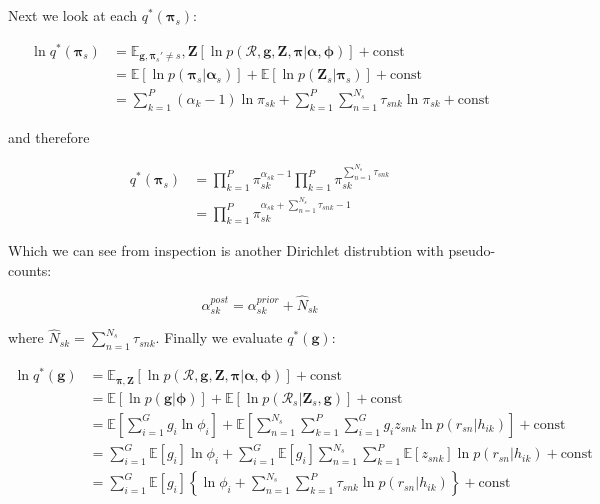 \documentclass{article}
\begin{document}
Next we look at each $q^*(\boldsymbol{\pi}_s)$:

\begin{align}
\label{eq:cnv_ln_q_pi}
\ln q^*(\boldsymbol{\pi}_s) &= \mathbb{E}_{\boldsymbol{g}, \boldsymbol{\pi}_s' \ne s}, \boldsymbol{Z} [\ln p(\mathcal{R}, \boldsymbol{g}, \boldsymbol{Z}, \boldsymbol{\pi} | \boldsymbol{\alpha}, \boldsymbol{\phi})] + \text{const} \\
&= \mathbb{E}[\ln p(\boldsymbol{\pi}_s | \boldsymbol{\alpha}_s)] + \mathbb{E}[\ln p(\boldsymbol{Z}_s | \boldsymbol{\pi}_s)] + \text{const} \\
&= \sum_{k = 1}^P (\alpha_k - 1) \ln \pi_{sk} + \sum_{k = 1}^P \sum_{n = 1}^{N_s} \tau_{snk} \ln \pi_{sk} + \text{const}
\end{align}

and therefore

\begin{align}
\label{eq:cnv_q_pi}
q^*(\boldsymbol{\pi}_s) &= \prod_{k = 1}^P \pi_{sk}^{\alpha_{sk} - 1} \prod_{k = 1}^P \pi_{sk}^{\sum_{n = 1}^{N_s} \tau_{snk}} \\
&=  \prod_{k = 1}^P \pi_{sk}^{\alpha_{sk} + \sum_{n = 1}^{N_s} \tau_{snk} - 1}
\end{align}

Which we can see from inspection is another Dirichlet distrubtion with pseudo-counts:

\begin{equation}
\label{eq:cnv_new_counts}
\alpha_{sk}^{post} = \alpha_{sk}^{prior} + \hat{N}_{sk}
\end{equation}

where $\hat{N}_{sk} = \sum_{n = 1}^{N_s} \tau_{snk}$. Finally we evaluate $q^*(\boldsymbol{g})$:

\begin{align}
\label{eq:cnv_ln_q_g}
\ln q^*(\boldsymbol{g}) &= \mathbb{E}_{\boldsymbol{\pi}, \boldsymbol{Z}} [\ln p(\mathcal{R}, \boldsymbol{g}, \boldsymbol{Z}, \boldsymbol{\pi} | \boldsymbol{\alpha}, \boldsymbol{\phi})] + \text{const} \\
&= \mathbb{E}[\ln p(\boldsymbol{g} | \boldsymbol{\phi})] + \mathbb{E}[\ln p(\mathcal{R}_s | \boldsymbol{Z}_s, \boldsymbol{g})] + \text{const} \\
&= \mathbb{E} \left [\sum_{i = 1}^G g_i \ln \phi_i \right] + \mathbb{E} \left[ \sum_{n = 1}^{N_s} \sum_{k = 1}^P \sum_{i = 1}^G g_i z_{snk} \ln p(r_{sn} | h_{ik}) \right] + \text{const} \\
&= \sum_{i = 1}^G \mathbb{E}[g_i] \ln \phi_i +  \sum_{i = 1}^G \mathbb{E}[g_i] \sum_{n = 1}^{N_s} \sum_{k = 1}^P \mathbb{E}[z_{snk}] \ln p(r_{sn} | h_{ik}) + \text{const} \\
&= \sum_{i = 1}^G \mathbb{E}[g_i] \left\{ \ln \phi_i + \sum_{n = 1}^{N_s} \sum_{k = 1}^P \tau_{snk} \ln p(r_{sn} | h_{ik}) \right\} + \text{const}
\end{align}
\end{document}
